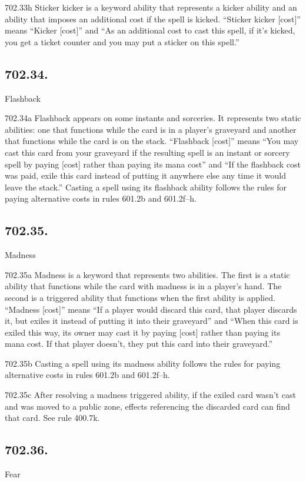 702.33h Sticker kicker is a keyword ability that represents a kicker ability and an ability that imposes an additional cost if the spell is kicked. “Sticker kicker [cost]” means “Kicker [cost]” and “As an additional cost to cast this spell, if it’s kicked, you get a ticket counter and you may put a sticker on this spell.”

\subsection*{702.34.}
Flashback

702.34a Flashback appears on some instants and sorceries. It represents two static abilities: one that functions while the card is in a player’s graveyard and another that functions while the card is on the stack. “Flashback [cost]” means “You may cast this card from your graveyard if the resulting spell is an instant or sorcery spell by paying [cost] rather than paying its mana cost” and “If the flashback cost was paid, exile this card instead of putting it anywhere else any time it would leave the stack.” Casting a spell using its flashback ability follows the rules for paying alternative costs in rules 601.2b and 601.2f–h.

\subsection*{702.35.}
Madness

702.35a Madness is a keyword that represents two abilities. The first is a static ability that functions while the card with madness is in a player’s hand. The second is a triggered ability that functions when the first ability is applied. “Madness [cost]” means “If a player would discard this card, that player discards it, but exiles it instead of putting it into their graveyard” and “When this card is exiled this way, its owner may cast it by paying [cost] rather than paying its mana cost. If that player doesn’t, they put this card into their graveyard.”

702.35b Casting a spell using its madness ability follows the rules for paying alternative costs in rules 601.2b and 601.2f–h.

702.35c After resolving a madness triggered ability, if the exiled card wasn’t cast and was moved to a public zone, effects referencing the discarded card can find that card. See rule 400.7k.

\subsection*{702.36.}
Fear

